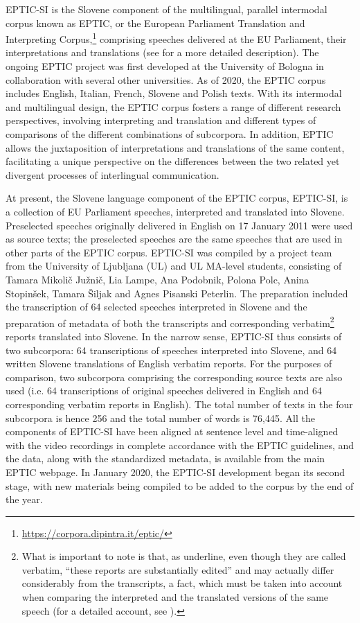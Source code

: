 \documentclass[output=paper]{langscibook}
\begin{document}
EPTIC-SI is the Slovene component of the multilingual, parallel intermodal corpus known as EPTIC, or the European Parliament Translation and Interpreting Corpus,\footnote{\url{https://corpora.dipintra.it/eptic/}} comprising speeches delivered at the EU Parliament, their interpretations and translations (see \citealt{BernardiniEtAl2016} for a more detailed description). The ongoing EPTIC project was first developed at the University of Bologna in collaboration with several other universities. As of 2020, the EPTIC corpus includes English, Italian, French, Slovene and Polish texts. With its intermodal and multilingual design, the EPTIC corpus fosters a range of different research perspectives, involving interpreting and translation and different types of comparisons of the different combinations of subcorpora. In addition, EPTIC allows the juxtaposition of interpretations and translations of the same content, facilitating a unique perspective on the differences between the two related yet divergent processes of interlingual communication. 

At present, the Slovene language component of the EPTIC corpus, EPTIC-SI, is a collection of EU Parliament speeches, interpreted and translated into Slovene. Preselected speeches originally delivered in English on 17 January 2011 were used as source texts; the preselected speeches are the same speeches that are used in other parts of the EPTIC corpus. EPTIC-SI was compiled by a project team from the University of Ljubljana (UL) and UL MA-level students, consisting of Tamara Mikolič Južnič, Lia Lampe, Ana Podobnik, Polona Polc, Anina Stopinšek, Tamara Šiljak and Agnes Pisanski Peterlin. The preparation included the transcription of 64 selected speeches interpreted in Slovene and the preparation of metadata of both the transcripts and corresponding verbatim\footnote{What is important to note is that, as \citet[68]{BernardiniEtAl2016}  underline, even though they are called verbatim, “these reports are substantially edited” and may actually differ considerably from the transcripts, a fact, which must be taken into account when comparing the interpreted and the translated versions of the same speech (for a detailed account, see \citealt[62--70]{BernardiniEtAl2016}).} reports translated into Slovene. In the narrow sense, EPTIC-SI thus consists of two subcorpora: 64 transcriptions of speeches interpreted into Slovene, and 64 written Slovene translations of English verbatim reports. For the purposes of comparison, two subcorpora comprising the corresponding source texts are also used (i.e. 64 transcriptions of original speeches delivered in English and 64 corresponding verbatim reports in English). The total number of texts in the four subcorpora is hence 256 and the total number of words is 76,445. All the components of EPTIC-SI have been aligned at sentence level and time-aligned with the video recordings in complete accordance with the EPTIC guidelines, and the data, along with the standardized metadata, is available from the main EPTIC webpage. In January 2020, the EPTIC-SI development began its second stage, with new materials being compiled to be added to the corpus by the end of the year.
\end{document}
